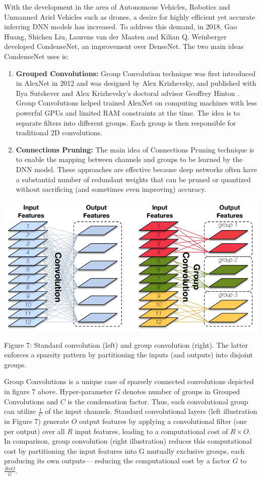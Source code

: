 \documentclass[conference]{IEEEtran}
\begin{document}
With the development in the area of Autonomous Vehicles, Robotics and Unmanned Ariel Vehicles such as drones, a desire for highly efficient yet accurate inferring DNN models has increased. To address this demand, in 2018, Gao Huang, Shichen Liu, Laurens van der Maaten and Kilian Q. Weinberger developed CondenseNet, an improvement over DenseNet.
The two main ideas CondenseNet uses is:
\begin{enumerate}
    \item \textbf{Grouped Convolutions:} Group Convolution technique was first introduced in AlexNet in 2012 and was designed by Alex Krizhevsky, and published with Ilya Sutskever and Alex Krizhevsky's doctoral advisor Geoffrey Hinton \cite{11}. Group Convolutions helped trained AlexNet on computing machines with less powerful GPUs and limited RAM constraints at the time. The idea is to separate filters into different groups. Each group is then responsible for traditional 2D convolutions.
    \item \textbf{Connections Pruning:} The main idea of Connections Pruning technique is to enable the mapping between channels and groups to be learned by the DNN model. These approaches are effective because deep networks often have a substantial number of redundant weights that can be pruned or quantized without sacrificing (and sometimes even improving) accuracy. \cite{12}
\end{enumerate}

\begin{center}
    \includegraphics[scale=0.3]{CondenseNet.PNG}\\
\end{center}
Figure 7: Standard convolution (left) and group convolution (right). The latter enforces a sparsity pattern by partitioning the inputs (and outputs) into disjoint groups. \cite{12}

Group Convolutions is a unique case of sparsely connected convolutions depicted in figure 7 above. Hyper-parameter $G$ denotes number of groups in Grouped Convolutions and $C$ is the condensation factor. Thus, each convolutional group can utilize \( \frac{1}{C} \) of the input channels. Standard convolutional layers (left illustration in Figure 7) generate $O$ output features by applying a convolutional filter (one per output) over all $R$ input features, leading to a computational cost of $R×O$. In comparison, group convolution (right illustration) reduces this computational cost by partitioning the input features into G mutually exclusive groups, each producing its own outputs—
reducing the computational cost by a factor $G$ to \( \frac{RxO}{G} \). \cite{12}
\end{document}
